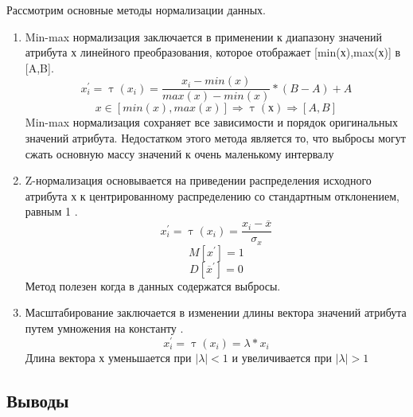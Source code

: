 Рассмотрим основные методы нормализации данных.
\begin{enumerate}
	\item Min-max нормализация заключается в применении к диапазону значений атрибута х линейного преобразования, которое отображает [min(х),max(х)] в [A,B].
	\begin{equation}
	\label{mixmaxNorm}
	x^\prime_i=\uptau(x_i)=\frac{x_i - min(x)}{max(x) - min(x)}*(B-A) + A
	\end{equation}
	\begin{equation}
	x \in[min(x), max(x)] \Rightarrow \uptau(х) \Rightarrow [A,B]
	\end{equation}
	Min-max нормализация сохраняет все зависимости и порядок оригинальных значений атрибута. Недостатком этого метода является то, что выбросы могут сжать основную массу значений к очень маленькому интервалу
	\item Z-нормализация  основывается на приведении распределения исходного атрибута х  к центрированному распределению со стандартным отклонением, равным 1 \cite{Book25} .
	\begin{equation}
	\label{ZNormalization}
	x^\prime_i=\uptau(x_i) =\frac{x_i - \overline{x}}{\sigma_x}
	\end{equation}
	\begin{equation}
	M[x^\prime]=1	 
	\end{equation}
	\begin{equation}
	D[\overline{x}^\prime]=0	 
	\end{equation}
	Метод полезен когда в данных содержатся выбросы.
	\item Масштабирование заключается в изменении длины вектора значений атрибута путем умножения на константу \cite{Book20} .
	\begin{equation}
	x^\prime_i=\uptau(x_i)=\lambda*x_i
	\end{equation}
	Длина вектора х уменьшается при $|\lambda|<1$ и увеличивается при $|\lambda|>1$ 
\end{enumerate}
\subsection{Выводы}

